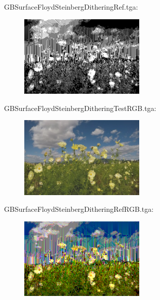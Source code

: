 GBSurfaceFloydSteinbergDitheringRef.tga:\\
\begin{center}
\begin{figure}[H]
\centering\includegraphics[width=6cm]{./GBSurfaceFloydSteinbergDitheringRef.png}\\
\end{figure}
\end{center}

GBSurfaceFloydSteinbergDitheringTestRGB.tga:\\
\begin{center}
\begin{figure}[H]
\centering\includegraphics[width=6cm]{./GBSurfaceFloydSteinbergDitheringTestRGB.png}\\
\end{figure}
\end{center}

GBSurfaceFloydSteinbergDitheringRefRGB.tga:\\
\begin{center}
\begin{figure}[H]
\centering\includegraphics[width=6cm]{./GBSurfaceFloydSteinbergDitheringRefRGB.png}\\
\end{figure}
\end{center}

